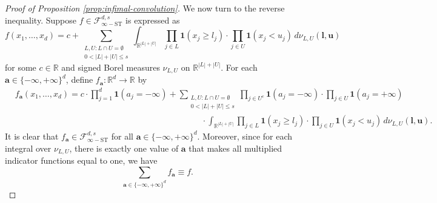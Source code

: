 \documentclass[10pt]{article}
\newcommand{\R}{{\mathbb R}}
\newcommand{\fstinf}{{\mathcal{F}^{d, s}_{\infty-\text{ST}}}}
\newcommand{\lbf}{{\mathbf{l}}}
\newcommand{\ubf}{{\mathbf{u}}}
\newcommand{\abf}{{\mathbf{a}}}
\newcommand{\ind}{{\mathbf{1}}}
\begin{document}
\begin{proof}[Proof of Proposition \ref{prop:infimal-convolution}]
We now turn to the reverse inequality. Suppose 
$f \in \fstinf$ is expressed as
\begin{equation*}
    f(x_1, \dots, x_d) =  c +
    \sum_{\substack{L, U : L \cap U = \emptyset \\
    0 < |L| + |U| \leq s }} 
    \int_{\R^{|L| + |U|}} \prod_{j \in L} \ind(x_j \ge l_j) 
    \cdot \prod_{j \in U} \ind(x_j < u_j)
    \, d \nu_{L, U}(\lbf, \ubf)
\end{equation*}
for some $c \in \R$ and signed Borel measures 
$\nu_{L, U}$ on $\R^{|L| + |U|}$. For each 
$\abf \in \{-\infty, +\infty\}^d$, define 
$f_{\abf}: \R^d \to \R$ by
\begin{equation*}
\begin{aligned}
    &f_{\abf}(x_1, \dots, x_d) 
    = c \cdot \prod_{j = 1}^{d} \ind(a_j = -\infty) 
    + \sum_{\substack{L, U : L \cap U = \emptyset \\
    0 < |L| + |U| \leq s }}
    \prod_{j \in U^c} \ind(a_j = -\infty)
    \cdot \prod_{j \in U} \ind(a_j = +\infty) \\
    &\qquad \qquad \qquad \qquad \qquad \qquad \qquad \qquad 
    \qquad \qquad \qquad
    \cdot \int_{\R^{|L| + |U|}} \prod_{j \in L} \ind(x_j \ge l_j) 
    \cdot \prod_{j \in U} \ind(x_j < u_j)
    \, d\nu_{L, U}(\lbf, \ubf).
\end{aligned}
\end{equation*}
It is clear that $f_{\abf} \in \fstinf$ for all 
$\abf \in \{-\infty, +\infty\}^d$.
Moreover, since for each integral over $\nu_{L, U}$, 
there is exactly one value of $\abf$ that makes all multiplied 
indicator functions equal to one, we have
\begin{equation*}
    \sum_{\abf \in \{-\infty, +\infty\}^d} f_{\abf} 
    \equiv f.
\end{equation*}


\end{proof}
\end{document}
